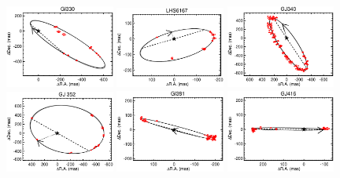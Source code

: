 \documentclass[twocolumn]{aastex62}
\begin{document}
\begin{figure}[htp]
\begin{center}
\includegraphics[width=0.32\textwidth]{Orbits/Gl330AB.eps}
\includegraphics[width=0.32\textwidth]{Orbits/LHS6167AB.eps}
\includegraphics[width=0.32\textwidth]{Orbits/GJ340AB.eps}
\includegraphics[width=0.32\textwidth]{Orbits/HIP46706AB.eps}%
\includegraphics[width=0.32\textwidth]{Orbits/Gl381AB.eps}
\includegraphics[width=0.32\textwidth]{Orbits/GJ416AB.eps}

\end{center}
\end{figure}
\end{document}
